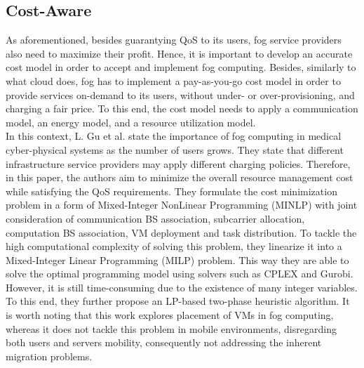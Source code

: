 \subsection{Cost-Aware}\label{sec:cost}
As aforementioned, besides guarantying QoS to its users, fog service providers also need to maximize their profit. Hence, it is important to develop an accurate cost model in order to accept and implement fog computing. Besides, similarly to what cloud does, fog has to implement a pay-as-you-go cost model in order to provide services on-demand to its users, without under- or over-provisioning, and charging a fair price. To this end, the cost model needs to apply a communication model, an energy model, and a resource utilization model.\\
\noindent\tab In this context, L. Gu et al. \cite{gu2017cost} state the importance of fog computing in medical cyber-physical systems as the number of users grows. They state that different infrastructure service providers may apply different charging policies. Therefore, in this paper, the authors aim to minimize the overall resource management cost while satisfying the QoS requirements. They formulate the cost minimization problem in a form of Mixed-Integer NonLinear Programming (MINLP) with joint consideration of communication BS association, subcarrier allocation, computation BS association, VM deployment and task distribution. To tackle the high computational complexity of solving this problem, they linearize it into a Mixed-Integer Linear Programming (MILP) problem. This way they are able to solve the optimal programming model using solvers such as CPLEX and Gurobi. However, it is still time-consuming due to the existence of many integer variables. To this end, they further propose an LP-based two-phase heuristic algorithm. It is worth noting that this work explores placement of VMs in fog computing, whereas it does not tackle this problem in mobile environments, disregarding both users and servers mobility, consequently not addressing the inherent migration problems.\\
